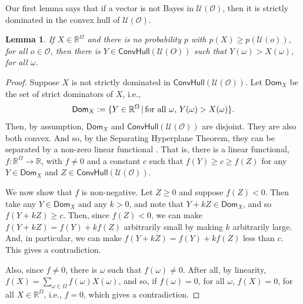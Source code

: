 \documentclass[a4paper,final]{article}
\newtheorem{lemma}[theorem]{Lemma}
\renewcommand\O{\mathcal{O}}
\newcommand\Uwald{\mathcal{U}} %
\newcommand{\Dom}{\mathsf{Dom}}
\renewcommand{\Re}{\mathbb{R}}
\newcommand{\Conv}{\mathsf{ConvHull}}
\newcommand\SetDelimiter[1][]{
	\nonscript\,#1\vert \allowbreak \nonscript\,\mathopen{}}
\providecommand\given{\SetDelimiter}
\renewcommand{\geq}{\geqslant}
\newenvironment{CCM rewritten}
{\begingroup\color{blue}} %
{\endgroup}              %
\begin{document}
	Our first lemma says that if a vector is not Bayes in $\Uwald(\O)$, then it is strictly dominated in the convex hull of $\Uwald(\O)$.
	\begin{lemma}\label{thm:cct:admiss in conv are Bayes in conv}
		If $X\in\Re^\Omega$ and  there is no probability $p$ with $p(X)\geq p(\Uwald(o))$, for all $o\in\O$, then there is $Y\in\Conv(\Uwald(O))$ such that $Y(\omega)>X(\omega)$, for all $\omega$.
	\end{lemma}
	\begin{proof}
		Suppose $X$ is not strictly dominated in $\Conv(\Uwald(\O))$. 
		Let $\Dom_X$ be the set of strict dominators of $X$, i.e., $$\Dom_X :=\{Y\in \Re^\Omega\given \text{for all $\omega$, }Y(\omega)>X(\omega)\}.$$ Then, by assumption, $\Dom_X $ and $\Conv(\Uwald(\O))$ are disjoint. They are also both convex. And so, by the Separating Hyperplane Theorem, they can be separated by a non-zero linear functional \citep[Section 2.5.1]{boyd2004co}. That is, there is a linear functional, $f:\Re^\Omega\to\Re$, with $f\neq 0$ and a constant $c$ such that $f(Y)\geq c \geq f(Z)$ for any $Y\in \Dom_X $ and $Z\in \Conv(\Uwald(\O))$.

		
		We now show that $f$ is non-negative. Let $Z\geq 0$ and suppose $f(Z)<0$. Then take any $Y\in \Dom_X $ and any $k > 0$, and note that $Y+kZ \in \Dom_X$, and so $f(Y + kZ) \geq c$. Then, since $f(Z) < 0$, we can make $f(Y+kZ)=f(Y)+kf(Z)$ arbitrarily small by making $k$ arbitrarily large. And, in particular, we can make $f(Y+kZ)=f(Y)+kf(Z)$ less than $c$. This gives a contradiction. 
		
		Also, since $f \neq 0$, there is $\omega$ such that $f(\omega)\neq 0$. After all, by linearity, $f(X) = \sum_{\omega\in\Omega}f(\omega)X(\omega)$, and so, if $f(\omega) = 0$, for all $\omega$, $f(X) = 0$, for all $X \in \Re^\Omega$, i.e., $f = 0$, which gives a contradiction. %
		

\end{proof}
\end{document}
